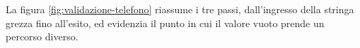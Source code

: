
La figura \ref{fig:validazione-telefono} riassume i tre passi, dall'ingresso della stringa grezza fino all'esito, ed evidenzia
il punto in cui il valore vuoto prende un percorso diverso. %

